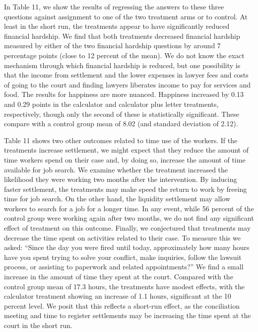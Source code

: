 \documentclass[oneside,12pt]{article}
\begin{document}
In Table 11, we show the results of regressing the answers to these three questions against assignment to one of the two treatment arms or to control. At least in the short run, the treatments appear to have significantly reduced financial hardship. We find that both treatments decreased financial hardship measured by either of the two financial hardship questions by around 7 percentage points (close to 12 percent of the mean). We do not know the exact mechanism through which financial hardship is reduced, but one possibility is that the income from settlement and the lower expenses in lawyer fees and costs of going to the court and finding lawyers liberates income to pay for services and food. The results for happiness are more nuanced. Happiness increased by 0.13 and 0.29 points in the calculator and calculator plus letter treatments, respectively, though only the second of these is statistically significant. These compare with a control group mean of 8.02 (and standard deviation of 2.12). 

Table 11 shows two other outcomes related to time use of the workers. If the treatments increase settlement, we might expect that they reduce the amount of time workers spend on their case and, by doing so, increase the amount of time available for job search. We examine whether the treatment increased the likelihood they were working two months after the intervention. By inducing faster settlement, the treatments may make speed the return to work by freeing time for job search. On the other hand, the liquidity settlement may allow workers to search for a job for a longer time. In any event, while 56 percent of the control group were working again after two months, we do not find any significant effect of treatment on this outcome. Finally, we conjectured that treatments may decrease the time spent on activities related to their case. To measure this we asked: “Since the day you were fired until today, approximately how many hours have you spent trying to solve your conflict, make inquiries, follow the lawsuit process, or assisting to paperwork and related appointments?” We find a small increase in the amount of time they spent at the court. Compared with the control group mean of 17.3 hours, the treatments have modest effects, with the calculator treatment showing an increase of 1.1 hours, significant at the 10 percent level. We posit that this reflects a short-run effect, as the conciliation meeting and time to register settlements may be increasing the time spent at the court in the short run.
\end{document}

